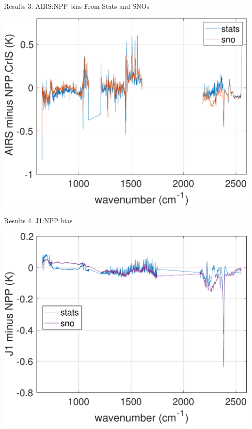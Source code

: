 \documentclass[10pt,t]{beamer}
\begin{document}
\begin{frame}{Results 3. AIRS:NPP bias From Stats and SNOs}

\vspace{-0.1in}
\begin{block}{}
  \begin{center}
    \includegraphics[width=0.6\linewidth]{./Figs/2018d060_2019d059_airs_npp_ac1_bias_stats_sno.pdf}
  \end{center}
\end{block}
    
\end{frame}

\begin{frame}{Results 4. J1:NPP bias}

\vspace{-0.1in}
\begin{block}{}
  \begin{center}
    \includegraphics[width=0.6\linewidth]{./Figs/2018_jn_ic1_ic2_stats_sno_bias.pdf}
  \end{center}
\end{block}
    
\end{frame}
\end{document}
